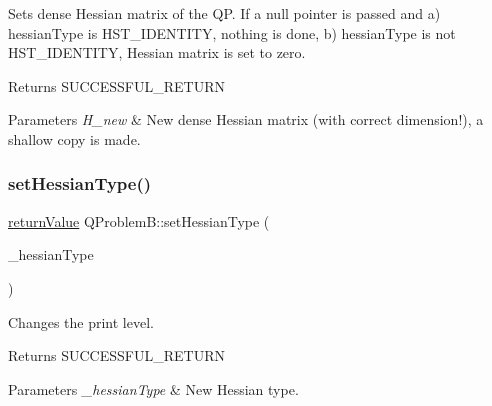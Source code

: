 Sets dense Hessian matrix of the QP. If a null pointer is passed and a) hessian\+Type is H\+S\+T\+\_\+\+I\+D\+E\+N\+T\+I\+TY, nothing is done, b) hessian\+Type is not H\+S\+T\+\_\+\+I\+D\+E\+N\+T\+I\+TY, Hessian matrix is set to zero. \begin{DoxyReturn}{Returns}
S\+U\+C\+C\+E\+S\+S\+F\+U\+L\+\_\+\+R\+E\+T\+U\+RN 
\end{DoxyReturn}

\begin{DoxyParams}{Parameters}
{\em H\+\_\+new} & New dense Hessian matrix (with correct dimension!), a shallow copy is made. \\
\hline
\end{DoxyParams}
\mbox{\label{class_q_problem_b_a8ad9f3322852e355ac2dc4e549e495e9}} 
\subsubsection{\texorpdfstring{set\+Hessian\+Type()}{setHessianType()}}
{\footnotesize\ttfamily \hyperlink{_message_handling_8hpp_a81d556f613bfbabd0b1f9488c0fa865e}{return\+Value} Q\+Problem\+B\+::set\+Hessian\+Type (\begin{DoxyParamCaption}\item[{\hyperlink{_types_8hpp_a604cad5cda14e378ce4a77ab28ee9fd9}{Hessian\+Type}}]{\+\_\+hessian\+Type }\end{DoxyParamCaption})\hspace{0.3cm}{\ttfamily [inline]}}

Changes the print level. \begin{DoxyReturn}{Returns}
S\+U\+C\+C\+E\+S\+S\+F\+U\+L\+\_\+\+R\+E\+T\+U\+RN 
\end{DoxyReturn}

\begin{DoxyParams}{Parameters}
{\em \+\_\+hessian\+Type} & New Hessian type. \\
\hline
\end{DoxyParams}
\mbox{\label{class_q_problem_b_a07d0ca4a5fcac26c857f41154e4ff6e3}} 
